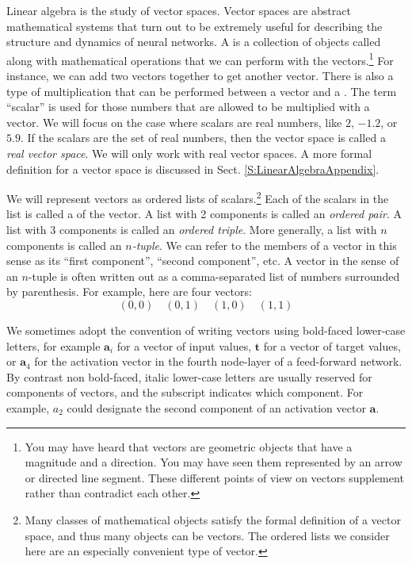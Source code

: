     Linear algebra is the study of vector spaces. Vector spaces are abstract
mathematical systems that turn out to be extremely useful for describing the 
structure and dynamics of neural networks. A  is a 
collection of objects called  along with mathematical 
operations that we can perform with the vectors.\footnote{You may have heard 
that vectors are geometric objects that have a magnitude and a direction. You 
may have seen them represented by an arrow or directed line segment. These 
different points of view on vectors supplement rather than contradict each 
other.}  For instance, we can add two vectors together to get another vector. There is also a type of 
multiplication that can be performed between a vector and a . The term ``scalar'' is used for those numbers that are allowed to be 
multiplied with a vector. We will focus on the case where scalars are real numbers, like $2$, $-1.2$, or $5.9$. If the scalars are the set of real numbers, then the 
vector space is called a {\em real vector space}. We will only work with real
vector spaces. A more formal definition for a vector space is discussed in 
Sect. \ref{S:LinearAlgebraAppendix}. 

We will represent vectors as ordered lists of scalars.\footnote{ Many classes of mathematical objects satisfy the formal definition
of a vector space, and thus many objects can be vectors. The ordered lists we consider here are an especially convenient type of vector.} Each of the scalars in the list is called a  
of the vector. A list with 2 components is called an {\em ordered pair}. A 
list with 3 components is called an {\em ordered triple}. More generally, a
list with $n$ components is called an {\em $n$-tuple}. We can refer to the
members of a vector in this sense  as its ``first component'',  ``second component'', etc.
A vector in the sense of an $n$-tuple is often 
written out as a comma-separated list of numbers surrounded by parenthesis. 
For example, here are four vectors:
\begin{equation*}
    (0,0) \quad (0,1) \quad (1,0) \quad (1,1) 
\end{equation*}

   We sometimes adopt the convention of writing vectors using bold-faced 
lower-case letters, for example $\mathbf{a}_i$ for a  vector of input values, 
$\mathbf{t}$ for a vector of target values, or $\mathbf{a}_4$ for the 
activation vector in the fourth node-layer of a feed-forward network.  By 
contrast non bold-faced, italic lower-case letters are usually reserved for 
components of vectors, and the subscript indicates which component. For 
example, $a_2$ could designate the second component of an activation vector 
$\mathbf{a}$.

